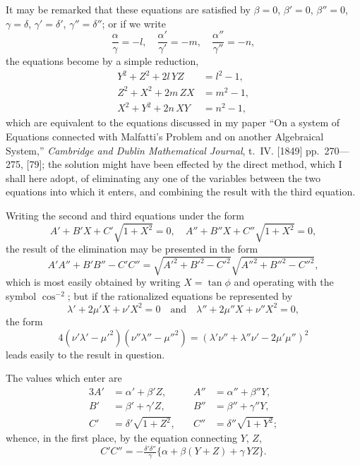 \documentclass[11pt]{article}
\begin{document}
\newpage
\setcounter{page}{68}

It may be remarked that these equations are satisfied by $\beta=0$, $\beta'=0$, $\beta''=0$, $\gamma=\delta$, $\gamma'=\delta'$, $\gamma''=\delta''$; or if we write
\[
\frac{\alpha}{\gamma} = -l, \quad \frac{\alpha'}{\gamma'} = -m, \quad \frac{\alpha''}{\gamma''} = -n,
\]
the equations become by a simple reduction,
\begin{align*}
Y^2+Z^2+2l\,YZ &= l^2-1,\\
Z^2+X^2+2m\,ZX &= m^2-1,\\
X^2+Y^2+2n\,XY &= n^2-1,
\end{align*}
which are equivalent to the equations discussed in my paper ``On a system of Equations connected with Malfatti's Problem and on another Algebraical System,'' \textit{Cambridge and Dublin Mathematical Journal}, t.~IV. [1849] pp.~270---275, [79]; the solution might have been effected by the direct method, which I shall here adopt, of eliminating any one of the variables between the two equations into which it enters, and combining the result with the third equation.

Writing the second and third equations under the form
\[
A'+B'X+C'\sqrt{1+X^2} = 0, \quad A''+B''X+C''\sqrt{1+X^2} = 0,
\]
the result of the elimination may be presented in the form
\[
A'A''+B'B''-C'C'' = \sqrt{A'^2+B'^2-C'^2}\sqrt{A''^2+B''^2-C''^2},
\]
which is most easily obtained by writing $X=\tan\phi$ and operating with the symbol $\cos^{-2}$; but if the rationalized equations be represented by
\[
\lambda'+2\mu'X+\nu'X^2 = 0 \quad \text{and} \quad \lambda''+2\mu''X+\nu''X^2 = 0,
\]
the form
\[
4(\nu'\lambda'-\mu'^2)(\nu''\lambda''-\mu''^2) = (\lambda'\nu''+\lambda''\nu'-2\mu'\mu'')^2
\]
leads easily to the result in question.

The values which enter are
\begin{alignat*}{3}
A' &= \alpha'+\beta'Z, \quad& A'' &= \alpha''+\beta''Y,\\
B' &= \beta'+\gamma'Z, \quad& B'' &= \beta''+\gamma''Y,\\
C' &= \delta'\sqrt{1+Z^2}, \quad& C'' &= \delta''\sqrt{1+Y^2};
\end{alignat*}
whence, in the first place, by the equation connecting $Y$, $Z$,
\[
C'C'' = -\tfrac{\delta'\delta''}{\gamma}\{\alpha+\beta(Y+Z)+\gamma\,YZ\}.
\]


\newpage
\setcounter{page}{69}
\end{document}
